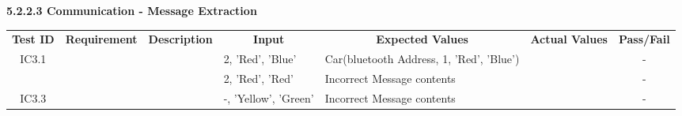 \documentclass [10pt]{article}
\begin{document}
     \textbf{5.2.2.3 Communication - Message Extraction} \vspace{2mm}
 \begin{longtable}{ | p{ } | p{ } |  p{ } |  p{ } | p{ } | p{ } |  p{ } |}  \hline

    \rowcolor{subsectionC}\textbf{Test ID}
    & \multicolumn{1}{c|}{\textbf{Requirement} }
    &\multicolumn{1}{c|}{\textbf{Description} }
    & \multicolumn{1}{c|}{\textbf{Input} }
    & \multicolumn{1}{c|}{\textbf{Expected Values} }
    & \multicolumn{1}{c|}{\textbf{Actual Values} }
    & \multicolumn{1}{c|}{\textbf{Pass/Fail}} \\  
    
       \multicolumn{1}{|c|}{IC3.1} 
    & 
    &
    & 2, 'Red', 'Blue'
    & Car(bluetooth Address, 1, 'Red', 'Blue') 
    &  
    & \multicolumn{1}{c|}{-}\\
    
    
    \rowcolor{tableCell}\multicolumn{1}{|c|}{IC3.2} 
    & 
    &
    & 2, 'Red', 'Red'
    & Incorrect Message contents
    &  
    & \multicolumn{1}{c|}{-}\\ 
    
    \multicolumn{1}{|c|}{IC3.3} 
    & 
    &
    & -, 'Yellow', 'Green'
    & Incorrect Message contents
    &  
    & \multicolumn{1}{c|}{-}\\ \hline
    
    \end{longtable}
    
\end{document}
